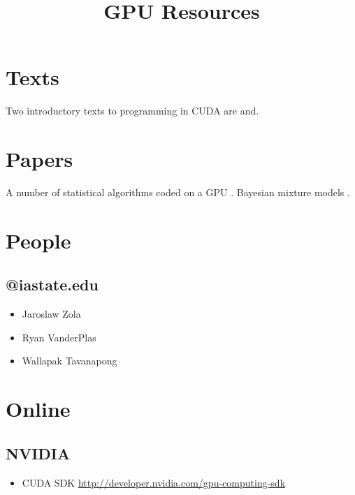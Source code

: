 \documentclass{article}
\title{GPU Resources}
\begin{document}
\section{Texts}

Two introductory texts to programming in CUDA are \cite{sanders2010cuda} and\cite{kirk2010programming}.

\section{Papers}

A number of statistical algorithms coded on a GPU \citep{lee2010utility}. Bayesian mixture models \citep{suchard2010understanding}.

\section{People}

\subsection{@iastate.edu}

\begin{itemize}
\item Jaroslaw Zola
\item Ryan VanderPlas
\item Wallapak Tavanapong
\end{itemize}

\section{Online}

\subsection{NVIDIA}

\begin{itemize}
\item CUDA SDK \url{http://developer.nvidia.com/gpu-computing-sdk} 
\end{itemize}



\end{document}
